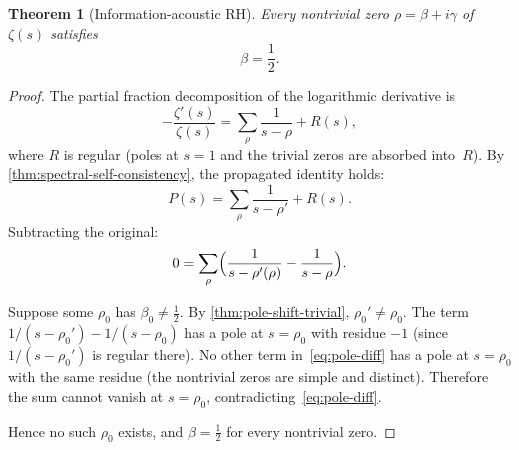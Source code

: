 \documentclass[11pt,a4paper]{article}
\theoremstyle{plain}
\newtheorem{theorem}{Theorem}[section]
\theoremstyle{definition}
\theoremstyle{remark}
\numberwithin{equation}{section}
\begin{document}
\begin{keyresultbox}
\begin{theorem}[Information-acoustic RH]
\label{thm:main-rh}
Every nontrivial zero \(\rho=\beta+i\gamma\) of \(\zeta(s)\) satisfies
\[
  \beta=\frac12.
\]
\end{theorem}
\end{keyresultbox}

\begin{proof}
The partial fraction decomposition of the logarithmic derivative is
\[
  -\frac{\zeta'(s)}{\zeta(s)}
  =\sum_\rho\frac{1}{s-\rho}+R(s),
\]
where \(R\) is regular (poles at \(s=1\) and the trivial zeros are
absorbed into~\(R\)).  By \cref{thm:spectral-self-consistency},
the propagated identity holds:
\[
  P(s)=\sum_\rho\frac{1}{s-\rho'}+R(s).
\]
Subtracting the original:
\begin{equation}\label{eq:pole-diff}
  0=\sum_\rho\Bigl(\frac{1}{s-\rho'(\rho)}-\frac{1}{s-\rho}\Bigr).
\end{equation}

Suppose some \(\rho_0\) has \(\beta_0\ne\tfrac12\).  By
\cref{thm:pole-shift-trivial}, \(\rho_0'\ne\rho_0\).  The term
\(1/(s-\rho_0')-1/(s-\rho_0)\) has a pole at \(s=\rho_0\) with
residue \(-1\) (since \(1/(s-\rho_0')\) is regular there).  No
other term in~\eqref{eq:pole-diff} has a pole at \(s=\rho_0\)
with the same residue (the nontrivial zeros are simple and
distinct).  Therefore the sum cannot vanish at \(s=\rho_0\),
contradicting~\eqref{eq:pole-diff}.

Hence no such \(\rho_0\) exists, and \(\beta=\tfrac12\) for every
nontrivial zero.
\end{proof}
\end{document}
